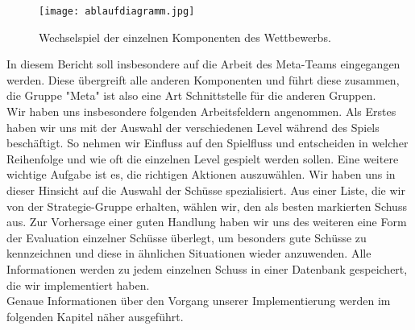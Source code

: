 \begin{figure} [h]
	\begin{center}
		\texttt{[image: ablaufdiagramm.jpg]}
		\caption{Wechselspiel der einzelnen Komponenten des Wettbewerbs.}
	\end{center}
\end{figure}

In diesem Bericht soll insbesondere auf die Arbeit des Meta-Teams eingegangen werden. Diese übergreift alle anderen Komponenten und führt diese zusammen, die Gruppe "Meta" ist also eine Art Schnittstelle für die anderen Gruppen.\\
Wir haben uns insbesondere folgenden Arbeitsfeldern angenommen. Als Erstes haben wir uns mit der Auswahl der verschiedenen Level während des Spiels beschäftigt. So nehmen wir Einfluss auf den Spielfluss und entscheiden in welcher Reihenfolge und wie oft die einzelnen Level gespielt werden sollen.
Eine weitere wichtige Aufgabe ist es, die richtigen Aktionen auszuwählen. Wir haben uns in dieser Hinsicht auf die Auswahl der Schüsse spezialisiert. Aus einer Liste, die wir von der Strategie-Gruppe erhalten, wählen wir, den als besten markierten Schuss aus. Zur Vorhersage einer guten Handlung haben wir uns des weiteren eine Form der Evaluation einzelner Schüsse überlegt, um besonders gute Schüsse zu kennzeichnen und diese in ähnlichen Situationen wieder anzuwenden.
Alle Informationen werden zu jedem einzelnen Schuss in einer Datenbank gespeichert, die wir implementiert haben.\\
Genaue Informationen über den Vorgang unserer Implementierung werden im folgenden Kapitel näher ausgeführt.